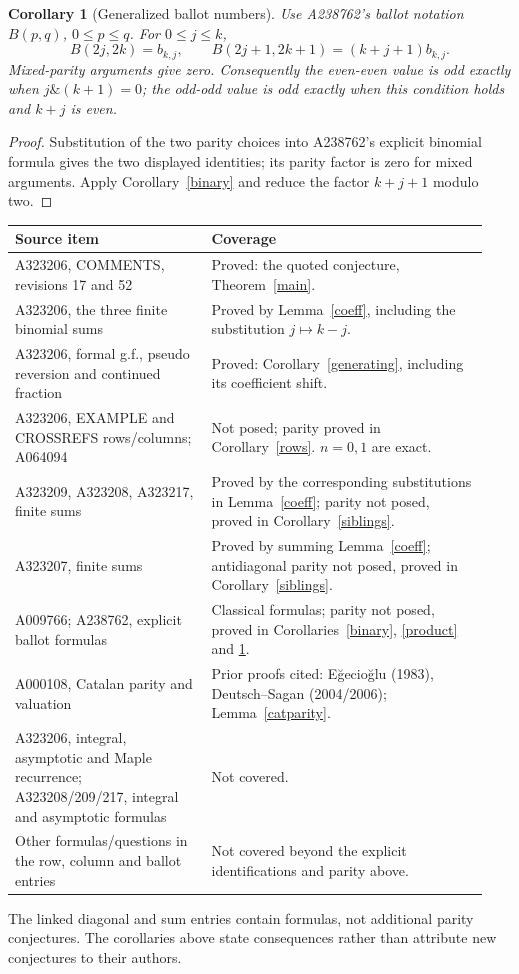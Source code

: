 \documentclass[11pt]{article}
\newtheorem{corollary}{Corollary}
\begin{document}
\begin{corollary}[Generalized ballot numbers]\label{generalballot}
Use A238762's ballot notation $B(p,q)$, $0\le p\le q$. For
$0\le j\le k$,
\[
 B(2j,2k)=b_{k,j},\qquad
 B(2j+1,2k+1)=(k+j+1)b_{k,j}.
\]
Mixed-parity arguments give zero. Consequently the even-even value is
odd exactly when $j\mathbin{\&}(k+1)=0$; the odd-odd value is odd exactly
when this condition holds and $k+j$ is even.
\end{corollary}
\begin{proof}
Substitution of the two parity choices into A238762's explicit
binomial formula gives the two displayed identities; its parity
factor is zero for mixed arguments. Apply Corollary~\ref{binary} and
reduce the factor $k+j+1$ modulo two.
\end{proof}

\begin{center}
\small
\begin{tabular}{@{}p{0.39\linewidth}p{0.55\linewidth}@{}}
\toprule
Source item & Coverage\\
\midrule
A323206, COMMENTS, revisions 17 and 52 & Proved: the quoted
conjecture, Theorem~\ref{main}.\\
A323206, the three finite binomial sums & Proved by Lemma~\ref{coeff},
  including the substitution $j\mapsto k-j$.\\
A323206, formal g.f., pseudo reversion and continued fraction &
  Proved: Corollary~\ref{generating}, including its coefficient shift.\\
A323206, EXAMPLE and CROSSREFS rows/columns; A064094 &
  Not posed; parity proved in Corollary~\ref{rows}. $n=0,1$ are exact.\\
A323209, A323208, A323217, finite sums & Proved by the corresponding
  substitutions in Lemma~\ref{coeff}; parity not posed, proved in
  Corollary~\ref{siblings}.\\
A323207, finite sums & Proved by summing Lemma~\ref{coeff};
  antidiagonal parity not posed, proved in Corollary~\ref{siblings}.\\
A009766; A238762, explicit ballot formulas & Classical formulas;
  parity not posed, proved in Corollaries~\ref{binary}, \ref{product}
  and \ref{generalballot}.\\
A000108, Catalan parity and valuation & Prior proofs cited:
  E\u{g}ecio\u{g}lu (1983), Deutsch--Sagan (2004/2006); Lemma~\ref{catparity}.\\
A323206, integral, asymptotic and Maple recurrence;
  A323208/209/217, integral and asymptotic formulas & Not covered.\\
Other formulas/questions in the row, column and ballot entries &
  Not covered beyond the explicit identifications and parity above.\\
\bottomrule
\end{tabular}
\end{center}
The linked diagonal and sum entries contain formulas, not additional
parity conjectures. The corollaries above state consequences rather than
attribute new conjectures to their authors.
\end{document}
